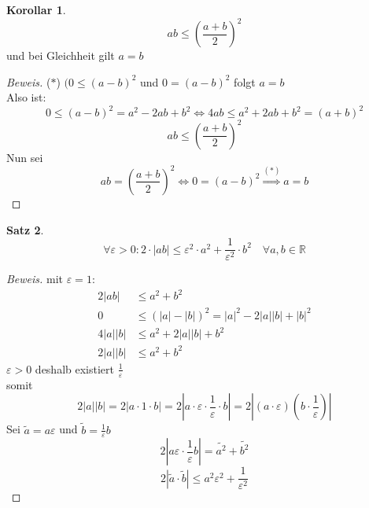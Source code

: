 \documentclass[12pt,a4paper,titlepage]{article} %
\theoremstyle{definition}
\newtheorem{satz}{Satz}[subsection]
\newtheorem{kor}[satz]{Korollar}
\theoremstyle{remark}
\newenvironment{bew}{\begin{proof}[Beweis]}{\end{proof}}
\newcommand{\R}{\mathbb{R}}
\begin{document}
	\begin{kor}
		\[ab \leq \left(\frac{a+b}{2}\right)^2\]
		und bei Gleichheit gilt \(a = b\)
	\end{kor}
	\begin{bew}
		(\(\ast\)) \((0 \leq (a-b)^2\) und \(0 = (a-b)^2\) folgt \(a = b\)\\
		Also ist:
		\[0 \leq (a-b)^2 = a^2 - 2ab + b^2 \Leftrightarrow 4ab \leq a^2 +2ab + b^2 = (a+b)^2\]
		\[ab \leq \left(\frac{a+b}{2}\right)^2\]
		Nun sei
		\[ab = \left(\frac{a+b}{2}\right)^2 \Leftrightarrow 0 = (a-b)^2 \overset{(\ast)}{\Rightarrow} a = b\]
	\end{bew}
	\begin{satz}
		\[\forall \varepsilon > 0: 2 \cdot |ab| \leq \varepsilon^2 \cdot a^2 + \frac{1}{\varepsilon^2} \cdot b^2 \quad \forall a,b \in \R\]
	\end{satz}
	\begin{bew}
		mit \(\varepsilon = 1\):\\
		\begin{align*}
			2|ab| &\leq a^2 + b^2\\
			0 &\leq (|a| - |b|)^2 = |a|^2 - 2|a||b| + |b|^2\\
			4|a||b| &\leq a^2 + 2|a||b| + b^2\\
			2|a||b| &\leq a^2 + b^2
		\end{align*}
		\(\varepsilon > 0\) deshalb existiert \(\frac{1}{\varepsilon}\)\\
		somit 
		\[2|a||b| = 2|a \cdot 1 \cdot b| = 2|a \cdot \varepsilon \cdot \frac{1}{\varepsilon} \cdot b| = 2|(a \cdot \varepsilon)(b \cdot \frac{1}{\varepsilon})|\]
		Sei \(\tilde{a} = a\varepsilon\) und \(\tilde{b} = \frac{1}{\varepsilon}b\)
		\[2\left|a\varepsilon \cdot \frac{1}{\varepsilon}b\right| = \tilde{a^2} + \tilde{b^2}\]
		\[2|\tilde{a} \cdot \tilde{b}| \leq a^2\varepsilon^2 + \frac{1}{\varepsilon^2}\] 
	\end{bew}
\end{document}
